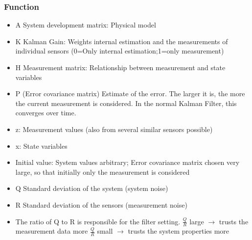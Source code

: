 \begin{minipage}{11cm}
	\small
	\subsubsection{Function}
		\begin{itemize}
			\item A System development matrix: Physical model
			\item K Kalman Gain: Weights internal estimation and the measurements of
			individual sensors (0=Only internal estimation;1=only measurement)
			\item H Measurement matrix: Relationship between measurement and state variables
			\item P (Error covariance matrix) Estimate of the error. The larger it is, the
			more the current measurement is considered. In the normal Kalman Filter,
			this converges over time.
			\item z: Measurement values (also from several similar sensors possible)
			\item x: State variables
			\item Initial value: System values arbitrary; Error covariance matrix chosen very
			large, so that initially only the measurement is considered
			\item Q Standard deviation of the system (system noise)
			\item R Standard deviation of the sensors (measurement noise)
			\item The ratio of Q to R is responsible for the filter setting.\newline
			$\frac QR$ large $\rightarrow$ trusts the measurement data more\newline \hspace{4cm} $\frac QR$ small $\rightarrow$ trusts the system properties more
		\end{itemize}
	\normalsize
\end{minipage}



